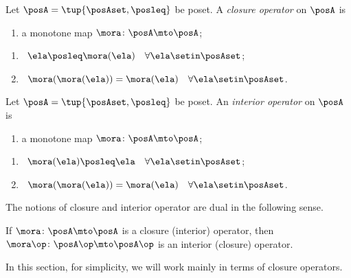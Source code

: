 \begin{definition}\label{def:closure-operator}
    Let $\posA = \tup{\posAset, \posleq}$ be poset.
    A \emph{closure operator} on $\posA$ is

    \constit
    \begin{enumerate}
        \item a monotone map $\mora \colon \posA \mto \posA$;
    \end{enumerate}

    \condit
    \begin{enumerate}
        \item {} \ $\ela \posleq \mora(\ela) \quad \forall \ela \setin \posAset$;
        \item {} \ $\mora (\mora(\ela)) = \mora(\ela) \quad \forall \ela \setin \posAset$.
    \end{enumerate}
\end{definition}

\begin{definition}\label{def:interior-operator}
    Let $\posA = \tup{\posAset, \posleq}$ be poset.
    An \emph{interior operator} on $\posA$ is

    \constit
    \begin{enumerate}
        \item a monotone map $\mora \colon \posA \mto \posA$;
    \end{enumerate}

    \condit
    \begin{enumerate}
        \item {} \ $\mora(\ela) \posleq \ela \quad \forall \ela \setin \posAset$;
        \item {} \ $\mora (\mora(\ela)) = \mora(\ela) \quad \forall \ela \setin \posAset$.
    \end{enumerate}
\end{definition}

The notions of closure and interior operator are dual in the following sense.

\begin{lemma}\label{lem:fca-opposites-of-closure-operators}
    If $\mora \colon \posA \mto \posA$ is a closure (interior) operator, then $\mora\op \colon \posA\op \mto \posA\op$ is an interior (closure) operator.
\end{lemma}

In this section, for simplicity, we will work mainly in terms of closure operators.


